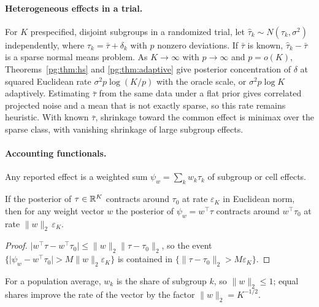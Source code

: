 \paragraph{Heterogeneous effects in a trial.} For $K$ prespecified, disjoint subgroups in a randomized trial, let $\hat\tau_k\sim N(\tau_k,\sigma^2)$ independently, where $\tau_k=\bar\tau+\delta_k$ with $p$ nonzero deviations. If $\bar\tau$ is known, $\hat\tau_k-\bar\tau$ is a sparse normal means problem. As $K\to\infty$ with $p\to\infty$ and $p=o(K)$, Theorems~\ref{pg:thm:hs} and \ref{pg:thm:adaptive} give posterior concentration of $\delta$ at squared Euclidean rate $\sigma^2p\log(K/p)$ with the oracle scale, or $\sigma^2p\log K$ adaptively. Estimating $\bar\tau$ from the same data under a flat prior gives correlated projected noise and a mean that is not exactly sparse, so this rate remains heuristic. With known $\bar\tau$, shrinkage toward the common effect is minimax over the sparse class, with vanishing shrinkage of large subgroup effects.

\paragraph{Accounting functionals.} Any reported effect is a weighted sum $\psi_w = \sum_kw_k\tau_k$ of subgroup or cell effects.

\begin{corollary}\label{pg:cor:linear}
If the posterior of $\tau\in\mathbb{R}^K$ contracts around $\tau_0$ at rate $\varepsilon_K$ in Euclidean norm, then for any weight vector $w$ the posterior of $\psi_w = w^\top\tau$ contracts around $w^\top\tau_0$ at rate $\lVert w\rVert_2\,\varepsilon_K$.
\end{corollary}
\begin{proof}
$\lvert w^\top\tau - w^\top\tau_0\rvert\le\lVert w\rVert_2\lVert\tau-\tau_0\rVert_2$, so the event $\{\lvert\psi_w - w^\top\tau_0\rvert > M\lVert w\rVert_2\varepsilon_K\}$ is contained in $\{\lVert\tau-\tau_0\rVert_2 > M\varepsilon_K\}$.
\end{proof}

For a population average, $w_k$ is the share of subgroup $k$, so $\lVert w\rVert_2\le1$; equal shares improve the rate of the vector by the factor $\lVert w\rVert_2 = K^{-1/2}$.

